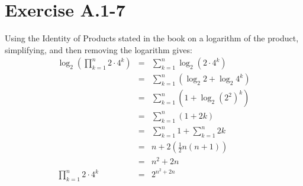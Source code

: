 \documentclass{article}
\begin{document}
\section*{Exercise A.1-7}

Using the Identity of Products stated in the book on a logarithm of the product, simplifying, and then removing the logarithm gives:
\begin{eqnarray*}
	\log_2 \left ( \prod_{k=1}^n 2 \cdot 4^k \right ) & = & \sum_{k=1}^n \log_2 \left ( 2 \cdot 4^k \right ) \\
	& = & \sum_{k=1}^n \left ( \log_2 2 + \log_2 4^k \right ) \\
	& = & \sum_{k=1}^n \left ( 1 + \log_2 \left ( 2^2 \right )^k \right ) \\
	& = & \sum_{k=1}^n \left ( 1 + 2k \right ) \\
	& = & \sum_{k=1}^n 1 + \sum_{k=1}^n 2k \\
	& = & n + 2 \left ( \frac{1}{2} n \left ( n+1 \right ) \right ) \\
	& = & n^2 + 2n \\
	\prod_{k=1}^n 2 \cdot 4^k & = & 2^{n^2 + 2n}
\end{eqnarray*}
\end{document}
